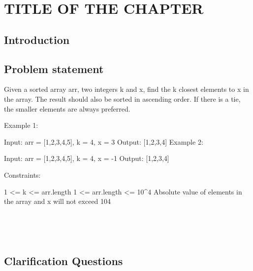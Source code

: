 %

\chapter{TITLE OF THE CHAPTER}
\label{ch:find_k_closest_in_array}
\section*{Introduction}

\section{Problem statement}
\begin{exercise}

	Given a sorted array arr, two integers k and x, find the k closest elements to x in the array. The result should also be sorted in ascending order. If there is a tie, the smaller elements are always preferred.

 

	Example 1:
	
	Input: arr = [1,2,3,4,5], k = 4, x = 3
	Output: [1,2,3,4]
	Example 2:
	
	Input: arr = [1,2,3,4,5], k = 4, x = -1
	Output: [1,2,3,4]
	 
	
	Constraints:
	
	1 <= k <= arr.length
	1 <= arr.length <= 10^4
	Absolute value of elements in the array and x will not exceed 104
	\begin{example}
		\hfill \
		
	\end{example}

	\begin{example}
		\hfill \
		
	\end{example}
\end{exercise}

\section{Clarification Questions}

\begin{QandA}
	\item 
	\begin{answered}
		\textit{}
	\end{answered}
	
\end{QandA}

